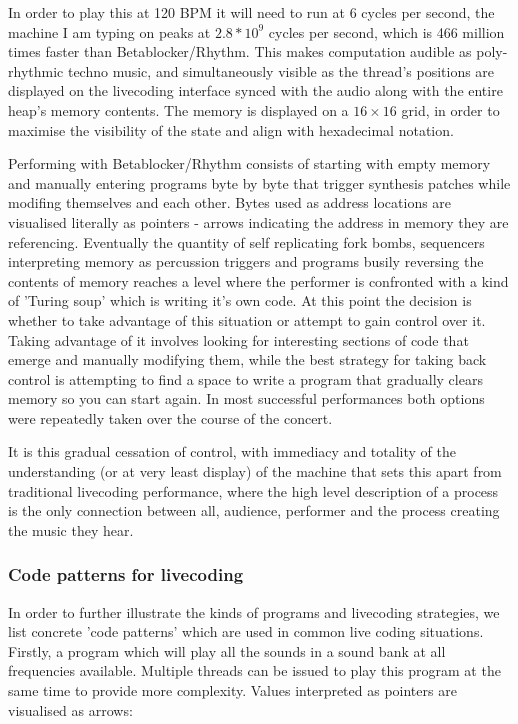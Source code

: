 \documentclass[letterpaper, 12pt]{article}
\begin{document}
In order to play this at 120 BPM it will need to run at 6 cycles per second, the machine I am typing on peaks at $2.8*10^9$ cycles per second, which is 466 million times faster than Betablocker/Rhythm. 
This makes computation audible as poly-rhythmic techno music, and simultaneously visible as the thread's positions are displayed on the livecoding interface synced with the audio along with the entire heap's memory contents. The memory is displayed on a $16\times16$ grid, in order to maximise the visibility of the state and align with hexadecimal notation.

Performing with Betablocker/Rhythm consists of starting with empty memory and manually entering programs byte by byte that trigger synthesis patches while modifing themselves and each other. Bytes used as address locations are visualised literally as pointers - arrows indicating the address in memory they are referencing. 
Eventually the quantity of self replicating fork bombs, sequencers interpreting memory as percussion triggers and programs busily reversing the contents of memory reaches a level where the performer is confronted with a kind of 'Turing soup' which is writing it's own code. 
At this point the decision is whether to take advantage of this situation or attempt to gain control over it.
Taking advantage of it involves looking for interesting sections of code that emerge and manually modifying them, while the best strategy for taking back control is attempting to find a space to write a program that gradually clears memory so you can start again. 
In most successful performances both options were repeatedly taken over the course of the concert.

It is this gradual cessation of control, with immediacy and totality of the understanding (or at very least display) of the machine that sets this apart from traditional livecoding performance, where the high level description of a process is the only connection between all, audience, performer and the process creating the music they hear.
\parskip 18pt

\subsubsection{Code patterns for livecoding}
\label{ssub:code_patterns_for_livecoding}

In order to further illustrate the kinds of programs and livecoding strategies, we list concrete 'code patterns' which are used in common live coding situations.
Firstly, a program which will play all the sounds in a sound bank at all frequencies available. 
Multiple threads can be issued to play this program at the same time to provide more complexity. 
Values interpreted as pointers are visualised as arrows:
\end{document}
